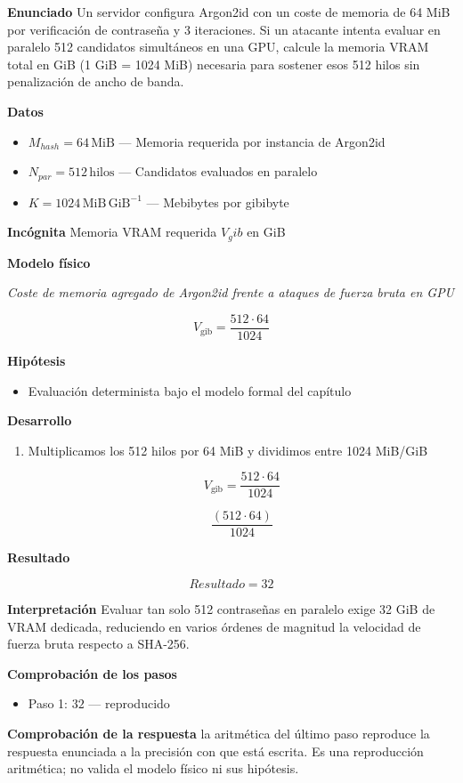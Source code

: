 \documentclass{book}
\begin{document}
\begin{tcolorbox}[title={Problema resuelto}, studiumworked, breakable]

\noindent\textbf{Enunciado}
Un servidor configura Argon2id con un coste de memoria de 64 MiB por verificación de contraseña y 3 iteraciones. Si un atacante intenta evaluar en paralelo 512 candidatos simultáneos en una GPU, calcule la memoria VRAM total en GiB (1 GiB = 1024 MiB) necesaria para sostener esos 512 hilos sin penalización de ancho de banda.

\noindent\textbf{Datos}
\begin{itemize}
\item $M_{hash} = 64\,\mathrm{MiB}$ — Memoria requerida por instancia de Argon2id
\item $N_{par} = 512\,\mathrm{hilos}$ — Candidatos evaluados en paralelo
\item $K = 1024\,\mathrm{MiB}\,\mathrm{GiB}^{-1}$ — Mebibytes por gibibyte
\end{itemize}

\noindent\textbf{Incógnita}
Memoria VRAM requerida \(V_gib\) en GiB

\noindent\textbf{Modelo físico}

\noindent\textit{Coste de memoria agregado de Argon2id frente a ataques de fuerza bruta en GPU}

\[
V_{\text{gib}} = \frac{512 \cdot 64}{1024}
\]

\noindent\textbf{Hipótesis}
\begin{itemize}
\item Evaluación determinista bajo el modelo formal del capítulo
\end{itemize}

\noindent\textbf{Desarrollo}
\begin{enumerate}
\item
Multiplicamos los 512 hilos por 64 MiB y dividimos entre 1024 MiB/GiB

\[
V_{\text{gib}} = \frac{512 \cdot 64}{1024}
\]

\[
\frac{\left(512\cdot 64\right)}{1024}
\]
\end{enumerate}

\noindent\textbf{Resultado}

\[
Resultado = 32
\]

\noindent\textbf{Interpretación}
Evaluar tan solo 512 contraseñas en paralelo exige 32 GiB de VRAM dedicada, reduciendo en varios órdenes de magnitud la velocidad de fuerza bruta respecto a SHA-256.

\noindent\textbf{Comprobación de los pasos}
\begin{itemize}
\item Paso 1: $32$ — reproducido
\end{itemize}

\noindent\textbf{Comprobación de la respuesta} la aritmética del último paso reproduce la respuesta enunciada a la precisión con que está escrita. Es una reproducción aritmética; no valida el modelo físico ni sus hipótesis.
\end{tcolorbox}
\end{document}
